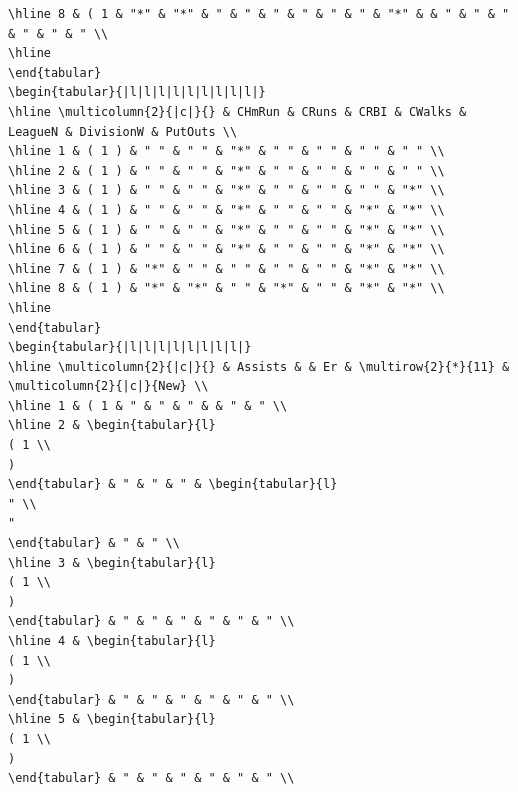 \documentclass[10pt]{article}
\begin{document}
\begin{verbatim}
\hline 8 & ( 1 & "*" & "*" & " & " & " & " & " & " & "*" & & " & " & " & " & " & " \\
\hline
\end{tabular}
\begin{tabular}{|l|l|l|l|l|l|l|l|l|}
\hline \multicolumn{2}{|c|}{} & CHmRun & CRuns & CRBI & CWalks & LeagueN & DivisionW & PutOuts \\
\hline 1 & ( 1 ) & " " & " " & "*" & " " & " " & " " & " " \\
\hline 2 & ( 1 ) & " " & " " & "*" & " " & " " & " " & " " \\
\hline 3 & ( 1 ) & " " & " " & "*" & " " & " " & " " & "*" \\
\hline 4 & ( 1 ) & " " & " " & "*" & " " & " " & "*" & "*" \\
\hline 5 & ( 1 ) & " " & " " & "*" & " " & " " & "*" & "*" \\
\hline 6 & ( 1 ) & " " & " " & "*" & " " & " " & "*" & "*" \\
\hline 7 & ( 1 ) & "*" & " " & " " & " " & " " & "*" & "*" \\
\hline 8 & ( 1 ) & "*" & "*" & " " & "*" & " " & "*" & "*" \\
\hline
\end{tabular}
\begin{tabular}{|l|l|l|l|l|l|l|l|}
\hline \multicolumn{2}{|c|}{} & Assists & & Er & \multirow{2}{*}{11} & \multicolumn{2}{|c|}{New} \\
\hline 1 & ( 1 & " & " & " & & " & " \\
\hline 2 & \begin{tabular}{l}
( 1 \\
)
\end{tabular} & " & " & " & \begin{tabular}{l}
" \\
"
\end{tabular} & " & " \\
\hline 3 & \begin{tabular}{l}
( 1 \\
)
\end{tabular} & " & " & " & " & " & " \\
\hline 4 & \begin{tabular}{l}
( 1 \\
)
\end{tabular} & " & " & " & " & " & " \\
\hline 5 & \begin{tabular}{l}
( 1 \\
)
\end{tabular} & " & " & " & " & " & " \\

\end{verbatim}
\end{document}
